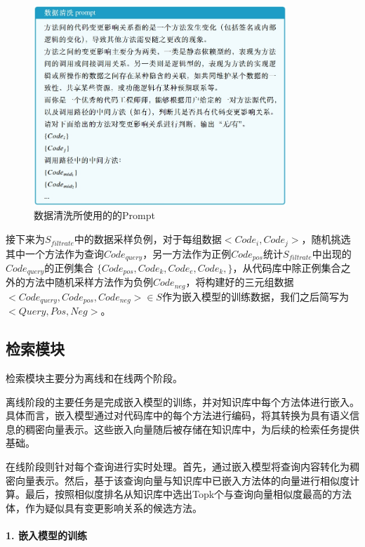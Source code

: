 \begin{figure}[htbp]
\centering
\includegraphics[width = 0.85\textwidth]{figures/2_数据清洗prompt.png}
\caption{数据清洗所使用的的Prompt}
\label{2_数据清洗prompt}
\end{figure}


接下来为$S_{filtrate}$中的数据采样负例，对于每组数据$<Code_i,Code_j>$，随机挑选其中一个方法作为查询$Code_{query}$，另一方法作为正例$Code_{pos}$统计$S_{filtrate}$中出现的$Code_{query}$的正例集合 $\{Code_{pos},Code_k,Code_e,Code_k,\}$，从代码库中除正例集合之外的方法中随机采样方法作为负例$Code_{neg}$，将构建好的三元组数据$<Code_{query},Code_{pos},Code_{neg}>\in S$作为嵌入模型的训练数据，我们之后简写为$<Query,Pos,Neg>$。

\subsection{检索模块}

检索模块主要分为离线和在线两个阶段。

离线阶段的主要任务是完成嵌入模型的训练，并对知识库中每个方法体进行嵌入。具体而言，嵌入模型通过对代码库中的每个方法进行编码，将其转换为具有语义信息的稠密向量表示。这些嵌入向量随后被存储在知识库中，为后续的检索任务提供基础。

在线阶段则针对每个查询进行实时处理。首先，通过嵌入模型将查询内容转化为稠密向量表示。然后，基于该查询向量与知识库中已嵌入方法体的向量进行相似度计算。最后，按照相似度排名从知识库中选出Topk个与查询向量相似度最高的方法体，作为疑似具有变更影响关系的候选方法。

\paragraph{1. 嵌入模型的训练}

